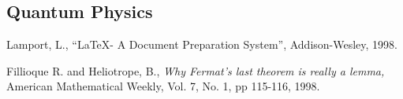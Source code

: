 \documentclass{article}
\begin{document}
\subsection{Quantum Physics}

\begin{thebibliography}{9}
         {\sc Lamport, L.,}
         ``\LaTeX - A Document Preparation System'',
         Addison-Wesley, 1998.

         {\sc Fillioque R.} and {\sc Heliotrope, B.,}
         {\em Why Fermat's last theorem is really a lemma,}
         American Mathematical Weekly,
         Vol. 7, No. 1, pp 115-116, 1998.

\end{thebibliography}
\end{document}
